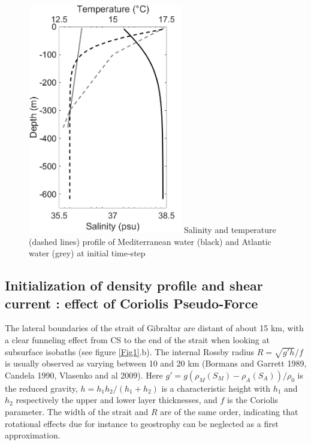 \documentclass[a4paper,12pt]{article}
\begin{document}
 ~
\begin{figure}[!t]
 \centering
 \includegraphics[width=0.6\textwidth]{profil_LEx.png}
  {Salinity and temperature (dashed lines) profile of Mediterranean water (black) and Atlantic water (grey) at initial time-step}
\label{fig_LEx}
\end{figure}


 
\subsection{Initialization of density profile and shear current : effect of Coriolis Pseudo-Force}
\label{Coriolis}

The lateral boundaries of the strait of Gibraltar are distant of about 15 km, with a clear funneling effect from CS to the end of the strait when looking at subsurface isobaths (see figure \ref{Fig1}.b). The internal Rossby radius $R={\sqrt{g'h}}/{f}$ is usually observed as varying between 10 and 20 km (Bormans and Garrett 1989, Candela 1990, Vlasenko and al 2009). Here $g'= g (\rho_M(S_M) - \rho_A(S_A))/\rho_0$ is the reduced gravity, $h=h_1 h_2/(h_1+h_2)$ is a characteristic height with $h_1$ and $h_2$ respectively the upper and lower layer thicknesses, and $f$ is the Coriolis parameter. The width of the strait and $R$ are of the same order, indicating that rotational effects due for instance to geostrophy can be neglected as a first approximation. 
\end{document}
